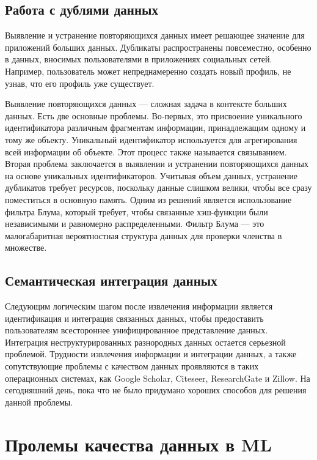 \documentclass{article}
\begin{document}
\subsection{Работа с дублями данных}

Выявление и устранение повторяющихся данных имеет решающее значение для приложений больших данных. Дубликаты распространены повсеместно, особенно в данных, вносимых пользователями в приложениях социальных сетей. Например, пользователь может непреднамеренно создать новый профиль, не узнав, что его профиль уже существует. 

Выявление повторяющихся данных — сложная задача в контексте больших данных. Есть две основные проблемы. Во-первых, это присвоение уникального идентификатора различным фрагментам информации, принадлежащим одному и тому же объекту. Уникальный идентификатор используется для агрегирования всей информации об объекте. Этот процесс также называется связыванием. Вторая проблема заключается в выявлении и устранении повторяющихся данных на основе уникальных идентификаторов. Учитывая объем данных, устранение дубликатов требует ресурсов, поскольку данные слишком велики, чтобы все сразу поместиться в основную память. Одним из решений является использование фильтра Блума, который требует, чтобы связанные хэш-функции были независимыми и равномерно распределенными. Фильтр Блума — это малогабаритная вероятностная структура данных для проверки членства в множестве.

\subsection{Семантическая интеграция данных}

Следующим логическим шагом после извлечения информации является идентификация и интеграция связанных данных, чтобы предоставить пользователям всестороннее унифицированное представление данных. Интеграция неструктурированных разнородных данных остается серьезной проблемой. Трудности извлечения информации и интеграции данных, а также сопутствующие проблемы с качеством данных проявляются в таких операционных системах, как Google Scholar, Citeseer, ResearchGate и Zillow. На сегодняшний день, пока что не было придумано хороших способов для решения данной проблемы.

\newpage

\section{Пролемы качества данных в ML}
\end{document}
